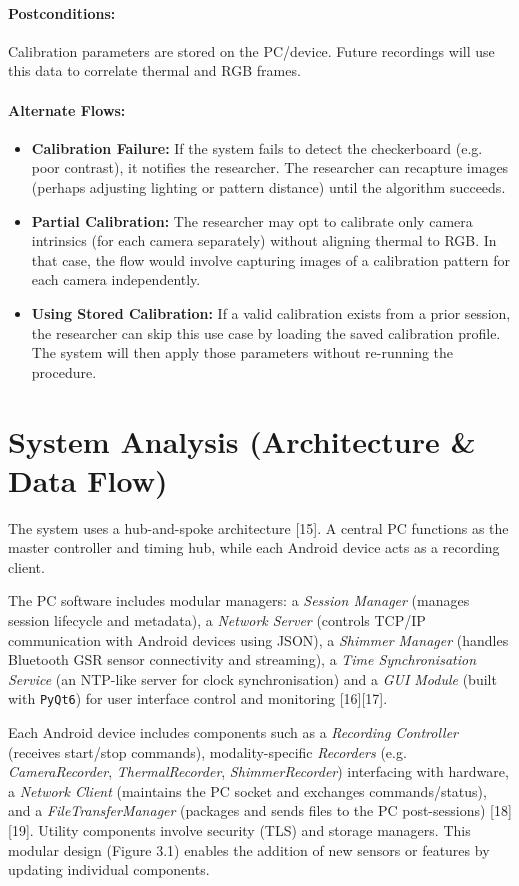 \paragraph{Postconditions:} Calibration parameters are stored on the PC/device. Future recordings will use this data to correlate thermal and RGB frames.

\paragraph{Alternate Flows:}
\begin{itemize}
    \item \textbf{Calibration Failure:} If the system fails to detect the checkerboard (e.g. poor contrast), it notifies the researcher. The researcher can recapture images (perhaps adjusting lighting or pattern distance) until the algorithm succeeds.
    \item \textbf{Partial Calibration:} The researcher may opt to calibrate only camera intrinsics (for each camera separately) without aligning thermal to RGB. In that case, the flow would involve capturing images of a calibration pattern for each camera independently.
    \item \textbf{Using Stored Calibration:} If a valid calibration exists from a prior session, the researcher can skip this use case by loading the saved calibration profile. The system will then apply those parameters without re-running the procedure.
\end{itemize}

\section{System Analysis (Architecture \& Data Flow)}

The system uses a hub-and-spoke architecture [15]. A central PC functions as the master controller and timing hub, while each Android device acts as a recording client.

The PC software includes modular managers: a \textit{Session Manager} (manages session lifecycle and metadata), a \textit{Network Server} (controls TCP/IP communication with Android devices using JSON), a \textit{Shimmer Manager} (handles Bluetooth GSR sensor connectivity and streaming), a \textit{Time Synchronisation Service} (an NTP-like server for clock synchronisation) and a \textit{GUI Module} (built with \texttt{PyQt6}) for user interface control and monitoring [16][17].

Each Android device includes components such as a \textit{Recording Controller} (receives start/stop commands), modality-specific \textit{Recorders} (e.g. \textit{CameraRecorder}, \textit{ThermalRecorder}, \textit{ShimmerRecorder}) interfacing with hardware, a \textit{Network Client} (maintains the PC socket and exchanges commands/status), and a \textit{FileTransferManager} (packages and sends files to the PC post-sessions) [18][19]. Utility components involve security (TLS) and storage managers. This modular design (Figure 3.1) enables the addition of new sensors or features by updating individual components.

